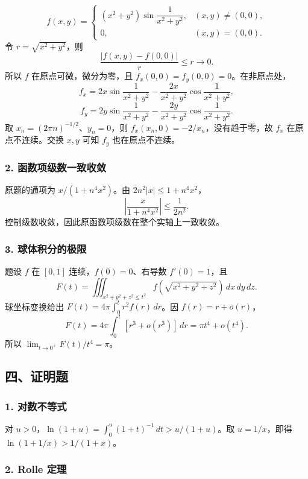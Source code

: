 \documentclass[11pt,fontset=fandol]{ctexart}
\begin{document}
\[
f(x,y)=\begin{cases}(x^2+y^2)\sin\dfrac1{x^2+y^2},&(x,y)\neq(0,0),\\0,&(x,y)=(0,0).\end{cases}
\] 令 \(r=\sqrt{x^2+y^2}\)，则 \[
\frac{|f(x,y)-f(0,0)|}{r}\leq r\longrightarrow0.
\] 所以 \(f\) 在原点可微，微分为零，且
\(f_x(0,0)=f_y(0,0)=0\)。在非原点处， \[
f_x=2x\sin\frac1{x^2+y^2}-\frac{2x}{x^2+y^2}\cos\frac1{x^2+y^2},
\] \[
f_y=2y\sin\frac1{x^2+y^2}-\frac{2y}{x^2+y^2}\cos\frac1{x^2+y^2}.
\] 取 \(x_n=(2\pi n)^{-1/2}\)、\(y_n=0\)，则
\(f_x(x_n,0)=-2/x_n\)，没有趋于零，故 \(f_x\) 在原点不连续。交换 \(x,y\)
可知 \(f_y\) 也在原点不连续。

\subsubsection{2.
函数项级数一致收敛}\label{ux51fdux6570ux9879ux7ea7ux6570ux4e00ux81f4ux6536ux655b}

原题的通项为 \(x/(1+n^4x^2)\)。由 \(2n^2|x|\leq1+n^4x^2\)， \[
\left|\frac{x}{1+n^4x^2}\right|\leq\frac1{2n^2}.
\] 控制级数收敛，因此原函数项级数在整个实轴上一致收敛。

\subsubsection{3.
球体积分的极限}\label{ux7403ux4f53ux79efux5206ux7684ux6781ux9650}

题设 \(f\) 在 \([0,1]\) 连续，\(f(0)=0\)、右导数 \(f'(0)=1\)，且 \[
F(t)=\iiint_{x^2+y^2+z^2\leq t^2}f(\sqrt{x^2+y^2+z^2})\,dx\,dy\,dz.
\] 球坐标变换给出 \(F(t)=4\pi\int_0^tr^2f(r)\,dr\)。因 \(f(r)=r+o(r)\)，
\[
F(t)=4\pi\int_0^t[r^3+o(r^3)]\,dr=\pi t^4+o(t^4).
\] 所以 \(\boxed{\lim_{t\to0^+}F(t)/t^4=\pi}\)。

\subsection{四、证明题}\label{ux56dbux8bc1ux660eux9898}

\subsubsection{1. 对数不等式}\label{ux5bf9ux6570ux4e0dux7b49ux5f0f}

对 \(u>0\)，\(\ln(1+u)=\int_0^u(1+t)^{-1}\,dt>u/(1+u)\)。取
\(u=1/x\)，即得 \(\ln(1+1/x)>1/(1+x)\)。

\subsubsection{2. Rolle 定理}\label{rolle-ux5b9aux7406}
\end{document}
